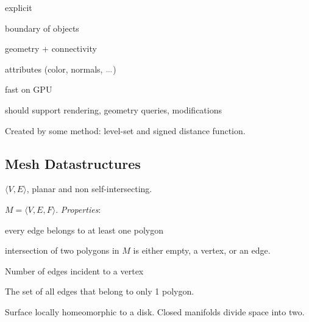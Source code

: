 \begin{definition}
  \begin{itemize*}
    \item explicit
    \item boundary of objects
    \item geometry + connectivity
    \item attributes (color, normals, \(\sdots\))
    \item fast on GPU
    \item should support rendering, geometry queries, modifications
  \end{itemize*}
\end{definition}

\begin{definition}
  Created by some method: level-set and signed distance function.
\end{definition}

\subsection{Mesh Datastructures}

\begin{definition}[Polygon]
  \(\langle V, E\rangle\), planar and non self-intersecting.
\end{definition}

\begin{definition}
  \(M = \langle V, E, F\rangle\).
  \textit{Properties}:
  \begin{itemize*}
    \item every edge belongs to at least one polygon
    \item intersection of two polygons in \(M\) is either empty, a vertex, or an edge.
  \end{itemize*}
\end{definition}

\begin{definition}[Valence]
  Number of edges incident to a vertex
\end{definition}

\begin{definition}[Boundary]
  The set of all edges that belong to only 1 polygon.
\end{definition}

\begin{definition}[Manifold]
  Surface locally homeomorphic to a disk. Closed manifolds divide space into two.
\end{definition}

